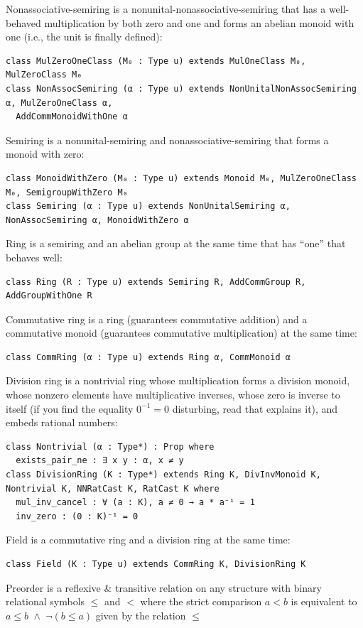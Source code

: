 \documentclass[]{article}
\renewcommand{\.}{\hskip .75pt}
\DeclareMathOperator{\aand}{\;\wedge\;}
\begin{document}
Nonassociative-semiring is a nonunital-nonassociative-semiring that has a well-behaved multiplication
by both zero and one and forms an abelian monoid with one (i.e., the unit is finally defined):
\begin{lstlisting}
class MulZeroOneClass (M₀ : Type u) extends MulOneClass M₀, MulZeroClass M₀
class NonAssocSemiring (α : Type u) extends NonUnitalNonAssocSemiring α, MulZeroOneClass α,
  AddCommMonoidWithOne α
\end{lstlisting}
Semiring is a nonunital-semiring and nonassociative-semiring that forms a monoid with zero:
\begin{lstlisting}
class MonoidWithZero (M₀ : Type u) extends Monoid M₀, MulZeroOneClass M₀, SemigroupWithZero M₀
class Semiring (α : Type u) extends NonUnitalSemiring α, NonAssocSemiring α, MonoidWithZero α
\end{lstlisting}
Ring is a semiring and an abelian group at the same time that has ``one'' that behaves well:
\begin{lstlisting}
class Ring (R : Type u) extends Semiring R, AddCommGroup R, AddGroupWithOne R
\end{lstlisting}
Commutative ring is a ring (guarantees commutative addition) and a commutative monoid
(guarantees commutative multiplication) at the same time:
\begin{lstlisting}
class CommRing (α : Type u) extends Ring α, CommMonoid α
\end{lstlisting}
Division ring is a nontrivial ring whose multiplication forms a division monoid, whose nonzero elements have
multiplicative inverses, whose zero is inverse to itself
(if you find the equality $0^{-1}\!=\!0$ disturbing, read \cite{DivBy0} that explains it),
and embeds rational numbers:
\begin{lstlisting}
class Nontrivial (α : Type*) : Prop where
  exists_pair_ne : ∃ x y : α, x ≠ y
class DivisionRing (K : Type*) extends Ring K, DivInvMonoid K, Nontrivial K, NNRatCast K, RatCast K where
  mul_inv_cancel : ∀ (a : K), a ≠ 0 → a * a⁻¹ = 1
  inv_zero : (0 : K)⁻¹ = 0
\end{lstlisting}
Field is a commutative ring and a division ring at the same time:
\begin{lstlisting}
class Field (K : Type u) extends CommRing K, DivisionRing K
\end{lstlisting}
Preorder is a reflexive \& transitive relation on any structure with binary relational symbols $\le$ and $<$
where the strict comparison $a < b$ is equivalent to $a \le b \aand \neg (b \le a)$ given by the relation $\le$
\end{document}
